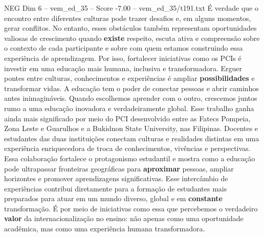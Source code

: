 \begin{textsample}{NEG Dim 6 – vem\_ed\_35 – Score -7.00 – vem\_ed\_35/t191.txt}
É verdade que o encontro entre diferentes culturas pode trazer desafios e, em alguns momentos, gerar conflitos.
No entanto, esses obstáculos também representam oportunidades valiosas de crescimento quando \textbf{existe} respeito, escuta ativa e compreensão sobre o contexto de cada participante e sobre com quem estamos construindo essa experiência de aprendizagem.
Por isso, fortalecer iniciativas como os PCIs é investir em uma educação mais humana, inclusiva e transformadora.
Erguer pontes entre culturas, conhecimentos e experiências é ampliar \textbf{possibilidades} e transformar vidas.
A educação tem o poder de conectar pessoas e abrir caminhos antes inimagináveis.
Quando escolhemos aprender com o outro, crescemos juntos rumo a uma educação inovadora e verdadeiramente global.
Esse trabalho ganha ainda mais significado por meio do PCI desenvolvido entre as Fatecs Pompeia, Zona Leste e Guarulhos e a Bukidnon State University, nas Filipinas.
Docentes e estudantes das duas instituições conectam culturas e realidades distintas em uma experiência enriquecedora de troca de conhecimentos, vivências e perspectivas.
Essa colaboração fortalece o protagonismo estudantil e mostra como a educação pode ultrapassar fronteiras geográficas para \textbf{aproximar} pessoas, ampliar horizontes e promover aprendizagens significativas.
Esse intercâmbio de experiências contribui diretamente para a formação de estudantes mais preparados para atuar em um mundo diverso, global e em \textbf{constante} transformação.
É por meio de iniciativas como essa que percebemos o verdadeiro \textbf{valor} da internacionalização no ensino: não apenas como uma oportunidade acadêmica, mas como uma experiência humana transformadora.

\end{textsample}
